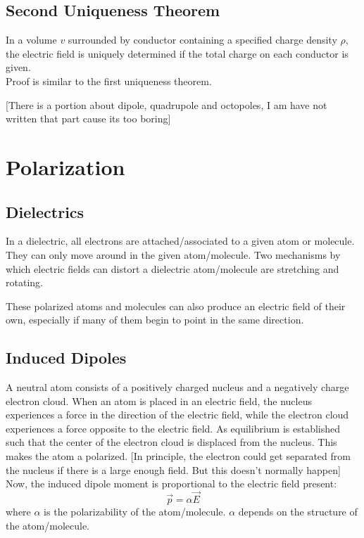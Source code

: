 \documentclass{article}
\begin{document}
\subsection{Second Uniqueness Theorem}
In a volume $v$ surrounded by conductor containing a specified charge density $\rho$, the electric field is uniquely determined if the total charge on each conductor is given.\\
Proof is similar to the first uniqueness theorem.

[There is a portion about dipole, quadrupole and octopoles, I am have not written that part cause its too boring]

\section{Polarization}
\subsection{Dielectrics}
In a dielectric, all electrons are attached/associated to a given atom or molecule. 
They can only move around in the given atom/molecule.
Two mechanisms by which electric fields can distort a dielectric atom/molecule are stretching and rotating.

These polarized atoms and molecules can also produce an electric field of their own, especially if many of them begin to point in the same direction.
\subsection{Induced Dipoles}
A neutral atom consists of a positively charged nucleus and a negatively charge electron cloud.
When an atom is placed in an electric field, the nucleus experiences a force in the direction of the electric field, while the electron cloud experiences a force opposite to the electric field. 
As equilibrium is established such that the center of the electron cloud is displaced from the nucleus.
This makes the atom a polarized.
[In principle, the electron could get separated from the nucleus if there is a large enough field. But this doesn't normally happen]\\
Now, the induced dipole moment is proportional to the electric field present:
\[ \vec{p} = \alpha \vec{E} \]
where $\alpha$ is the polarizability of the atom/molecule. $\alpha$ depends on the structure of the atom/molecule.
\end{document}
